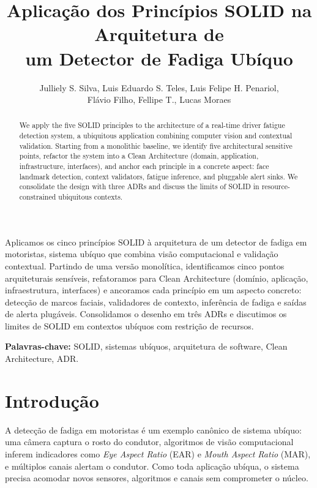 \documentclass[12pt]{article}
\title{Aplicação dos Princípios SOLID na Arquitetura de\\ um Detector de Fadiga Ubíquo}
\author{Julliely S. Silva\inst{1}, Luis Eduardo S. Teles\inst{2}, Luis Felipe H. Penariol\inst{3},\\
Flávio Filho\inst{4}, Fellipe T.\inst{5}, Lucas Moraes\inst{6}}
\begin{document}
\maketitle

\begin{abstract}
We apply the five SOLID principles to the architecture of a real-time driver fatigue detection system, a ubiquitous application combining computer vision and contextual validation. Starting from a monolithic baseline, we identify five architectural sensitive points, refactor the system into a Clean Architecture (domain, application, infrastructure, interfaces), and anchor each principle in a concrete aspect: face landmark detection, context validators, fatigue inference, and pluggable alert sinks. We consolidate the design with three ADRs and discuss the limits of SOLID in resource-constrained ubiquitous contexts.
\end{abstract}

\begin{resumo}
Aplicamos os cinco princípios SOLID à arquitetura de um detector de fadiga em motoristas, sistema ubíquo que combina visão computacional e validação contextual. Partindo de uma versão monolítica, identificamos cinco pontos arquiteturais sensíveis, refatoramos para Clean Architecture (domínio, aplicação, infraestrutura, interfaces) e ancoramos cada princípio em um aspecto concreto: detecção de marcos faciais, validadores de contexto, inferência de fadiga e saídas de alerta plugáveis. Consolidamos o desenho em três ADRs e discutimos os limites de SOLID em contextos ubíquos com restrição de recursos.
\end{resumo}

\noindent \textbf{Palavras-chave:} SOLID, sistemas ubíquos, arquitetura de software, Clean Architecture, ADR.

\section{Introdução}

\hspace{1,27cm}A detecção de fadiga em motoristas é um exemplo canônico de sistema ubíquo: uma câmera captura o rosto do condutor, algoritmos de visão computacional inferem indicadores como \textit{Eye Aspect Ratio} (EAR) e \textit{Mouth Aspect Ratio} (MAR), e múltiplos canais alertam o condutor. Como toda aplicação ubíqua, o sistema precisa acomodar novos sensores, algoritmos e canais sem comprometer o núcleo.
\end{document}
